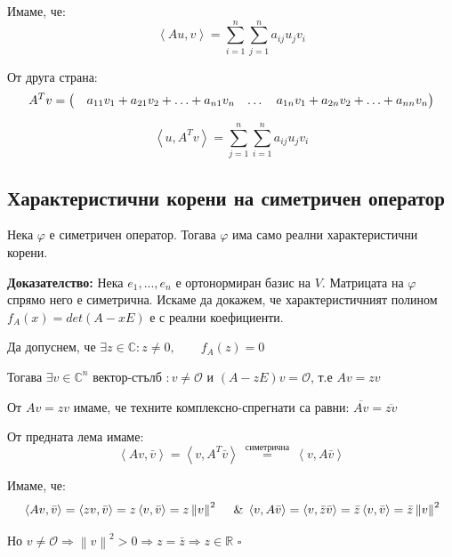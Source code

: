 \documentclass{article}
\renewcommand{\\}{\newline}
\newcommand{\amp}{\;\&\;}
\newcommand{\doc}{\textbf{Доказателство: }}
\newcommand{\proven}{\hfill $\square$}
\begin{document}
Имаме, че: \[
  \left\langle Au, v\right\rangle = \sum_{i=1}^{n}\sum_{j=1}^{n}a_{ij}u_jv_i
\] 

От друга страна: \[
  A^{T}v = \begin{pmatrix}
    &a_{11}v_1 + a_{21}v_2 +\ldots+a_{n1}v_n \\
    &\ldots \\
    &a_{1n}v_1+a_{2n}v_2 +\ldots+a_{nn}v_n \\
  \end{pmatrix}
\] 

\[
  \left\langle u, A^{T}v\right\rangle = \sum_{j=1}^{n}\sum_{i=1}^{n}a_{ij}u_{j}v_{i}
\] 

\subsection{Характеристични корени на симетричен оператор}

Нека \(\varphi\) е симетричен оператор. Тогава \(\varphi\) има само реални характеристични корени. 

\doc Нека \(e_1, ..., e_n\) е ортонормиран базис на \(V\). Матрицата на \(\varphi\) спрямо него е симетрична. Искаме да докажем, че характеристичният полином \(f_{A}(x) = det(A-xE)\) е с реални коефициенти.

Да допуснем, че \(\exists z \in \mathbb{C}: z\not= 0,\qquad f_{A}(z) = 0\)

Тогава \(\exists v \in \mathbb{C}^{n} \text{ вектор-стълб }: v\not=\mathcal{O}\) и \((A-zE)v = \mathcal{O}\), т.е \(Av = zv\)    

От \(Av = zv\) имаме, че техните комплексно-спрегнати са равни: \(\overline{Av} = \overline{zv}\)   

От предната лема имаме: 
\[
  \left\langle Av, \bar{v}\right\rangle = \left\langle v, A^{T}\bar{v}\right\rangle \overset{\text{ симетрична }}{=}\left\langle v, A \bar{v}\right\rangle
\] 

Имаме, че: \begin{align*}
& \left\langle Av, \bar{v}\right\rangle = \left\langle zv, \bar{v}\right\rangle = z \left\langle v, \bar{v}\right\rangle = z \left\|v\right\|^{2} \\ &\amp \left\langle v, A \bar{v}\right\rangle = \left\langle v, \bar{z}\bar{v}\right\rangle = \bar{z}\left\langle v, \bar{v}\right\rangle = \bar{z}\left\|v\right\|^{2}
\end{align*}

Но \(v \not= \mathcal{O} \Rightarrow \left\|v\right\|^{2} > 0 \Rightarrow z = \bar{z} \Rightarrow z \in \mathbb{R}\) \proven
\end{document}
